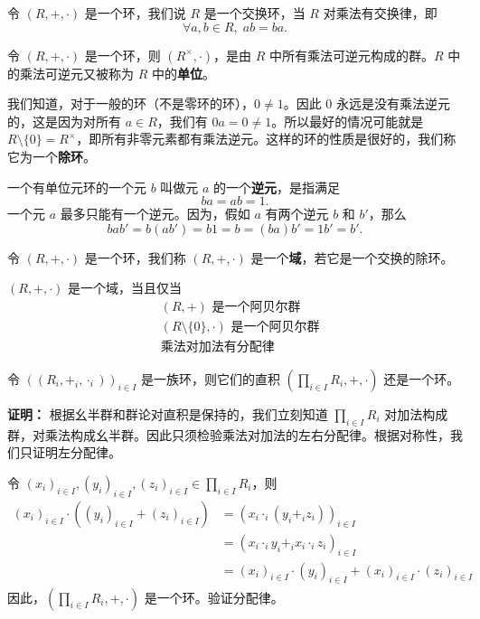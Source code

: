 \begin{definition}[定义 2.2：交换环]
令 $(R,+,\cdot)$ 是一个环，我们说 $R$ 是一个交换环，当 $R$ 对乘法有交换律，即
\[
\forall a,b\in R,\;ab=ba.
\]
\end{definition}

\begin{definition}[定义 2.3：单位与除环]
令 $(R,+,\cdot)$ 是一个环，则 $(R^\times,\cdot)$，是由 $R$ 中所有乘法可逆元构成的群。$R$ 中的乘法可逆元又被称为 $R$ 中的\textbf{单位}。

我们知道，对于一般的环（不是零环的环），$0\ne 1$。因此 $0$ 永远是没有乘法逆元的，这是因为对所有 $a\in R$，我们有 $0a=0\ne 1$。所以最好的情况可能就是 $R\setminus\{0\}=R^\times$，即所有非零元素都有乘法逆元。这样的环的性质是很好的，我们称它为一个\textbf{除环}。
\end{definition}

\begin{definition}[环中逆元]
一个有单位元环的一个元 $b$ 叫做元 $a$ 的一个\textbf{逆元}，是指满足
\[
ba=ab=1.
\]
一个元 $a$ 最多只能有一个逆元。因为，假如 $a$ 有两个逆元 $b$ 和 $b'$，那么
\[
bab'=b(ab')=b1=b=(ba)b'=1b'=b'.
\]
\end{definition}

\begin{definition}[定义 2.5：域]
令 $(R,+,\cdot)$ 是一个环，我们称 $(R,+,\cdot)$ 是一个\textbf{域}，若它是一个交换的除环。
\end{definition}

\begin{proposition}[命题 2.3：域的等价条件]
$(R,+,\cdot)$ 是一个域，当且仅当
\begin{align}
&(R,+)\text{ 是一个阿贝尔群}\\
&(R\setminus\{0\},\cdot)\text{ 是一个阿贝尔群}\\
&\text{乘法对加法有分配律}
\end{align}
\end{proposition}

\begin{proposition}[命题 2.5：环的直积还是环]
令 $((R_i,+_i,\cdot_i))_{i\in I}$ 是一族环，则它们的直积 $(\prod_{i\in I}R_i,+,\cdot)$ 还是一个环。

\textbf{证明：} 根据幺半群和群论对直积是保持的，我们立刻知道 $\prod_{i\in I}R_i$ 对加法构成群，对乘法构成幺半群。因此只须检验乘法对加法的左右分配律。根据对称性，我们只证明左分配律。

令 $(x_i)_{i\in I},(y_i)_{i\in I},(z_i)_{i\in I}\in\prod_{i\in I}R_i$，则
\begin{align}
(x_i)_{i\in I}\cdot((y_i)_{i\in I}+(z_i)_{i\in I})
&=(x_i\cdot_i(y_i+_i z_i))_{i\in I}\\
&=(x_i\cdot_i y_i+_i x_i\cdot_i z_i)_{i\in I}\\
&=(x_i)_{i\in I}\cdot(y_i)_{i\in I}+(x_i)_{i\in I}\cdot(z_i)_{i\in I}
\end{align}
因此，$(\prod_{i\in I}R_i,+,\cdot)$ 是一个环。验证分配律。
\end{proposition}

